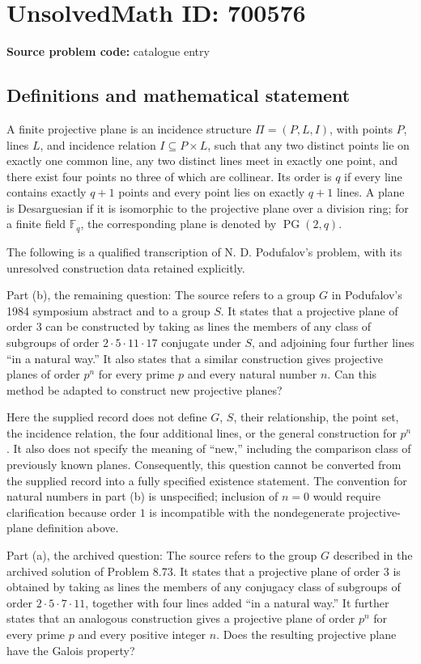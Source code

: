 \documentclass[11pt]{article}
\newcommand{\F}{\mathbb{F}}
\begin{document}
\section*{UnsolvedMath ID: 700576}
\textbf{Source problem code:} catalogue entry
\subsection{Definitions and mathematical statement}
A finite projective plane is an incidence structure \(\Pi=(P,L,I)\), with points \(P\), lines \(L\), and incidence relation \(I\subseteq P\times L\), such that any two distinct points lie on exactly one common line, any two distinct lines meet in exactly one point, and there exist four points no three of which are collinear. Its order is \(q\) if every line contains exactly \(q+1\) points and every point lies on exactly \(q+1\) lines. A plane is Desarguesian if it is isomorphic to the projective plane over a division ring; for a finite field \(\F_q\), the corresponding plane is denoted by \(\operatorname{PG}(2,q)\).

The following is a qualified transcription of N. D. Podufalov's problem, with its unresolved construction data retained explicitly.

Part (b), the remaining question: The source refers to a group \(G\) in Podufalov's 1984 symposium abstract and to a group \(S\). It states that a projective plane of order \(3\) can be constructed by taking as lines the members of any class of subgroups of order \(2\cdot5\cdot11\cdot17\) conjugate under \(S\), and adjoining four further lines ``in a natural way.'' It also states that a similar construction gives projective planes of order \(p^n\) for every prime \(p\) and every natural number \(n\). Can this method be adapted to construct new projective planes?

Here the supplied record does not define \(G\), \(S\), their relationship, the point set, the incidence relation, the four additional lines, or the general construction for \(p^n\). It also does not specify the meaning of ``new,'' including the comparison class of previously known planes. Consequently, this question cannot be converted from the supplied record into a fully specified existence statement. The convention for natural numbers in part (b) is unspecified; inclusion of \(n=0\) would require clarification because order \(1\) is incompatible with the nondegenerate projective-plane definition above.

Part (a), the archived question: The source refers to the group \(G\) described in the archived solution of Problem 8.73. It states that a projective plane of order \(3\) is obtained by taking as lines the members of any conjugacy class of subgroups of order \(2\cdot5\cdot7\cdot11\), together with four lines added ``in a natural way.'' It further states that an analogous construction gives a projective plane of order \(p^n\) for every prime \(p\) and every positive integer \(n\). Does the resulting projective plane have the Galois property?
\end{document}
